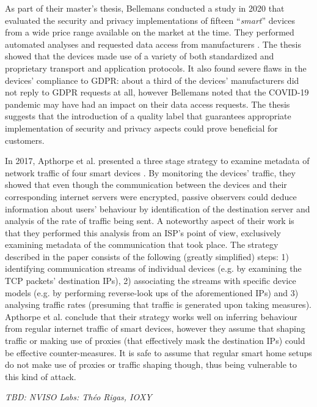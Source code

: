 As part of their master's thesis, Bellemans conducted a study in 2020 that evaluated the security and privacy implementations of fifteen \enquote{\emph{smart}} devices from a wide price range available on the market at the time. They performed automated analyses and requested data access from manufacturers \cite{JonahBellemans}. The thesis showed that the devices made use of a variety of both standardized and proprietary transport and application protocols. It also found severe flaws in the devices' compliance to \ac{GDPR}: about a third of the devices' manufacturers did not reply to \ac{GDPR} requests at all, however Bellemans noted that the COVID-19 pandemic may have had an impact on their data access requests. The thesis suggests that the introduction of a quality label that guarantees appropriate implementation of security and privacy aspects could prove beneficial for customers. \par
In 2017, Apthorpe et al. presented a three stage strategy to examine metadata of network traffic of four smart devices \cite{apthorpe2017smart}. By monitoring the devices' traffic, they showed that even though the communication between the devices and their corresponding internet servers were encrypted, passive observers could deduce information about users' behaviour by identification of the destination server and analysis of the rate of traffic being sent. A noteworthy aspect of their work is that they performed this analysis from an \ac{ISP}'s point of view, exclusively examining metadata of the communication that took place. The strategy described in the paper consists of the following (greatly simplified) steps: 1) identifying communication streams of individual devices (e.g. by examining the TCP packets' destination IPs), 2) associating the streams with specific device models (e.g. by performing reverse-look ups of the aforementioned IPs) and 3) analysing traffic rates (presuming that traffic is generated upon taking measures). Apthorpe et al. conclude that their strategy works well on inferring behaviour from regular internet traffic of smart devices, however they assume that shaping traffic or making use of proxies (that effectively mask the destination IPs) could be effective counter-measures. It is safe to assume that regular smart home setups do not make use of proxies or traffic shaping though, thus being vulnerable to this kind of attack. \par
\emph{TBD: NVISO Labs: Théo Rigas, IOXY \cite{rigas_ioxy}} %